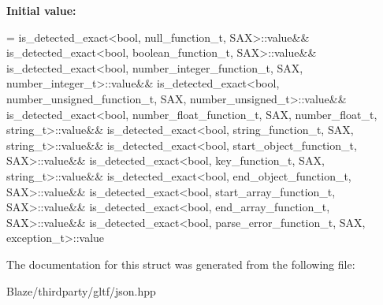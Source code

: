 {\bfseries Initial value\+:}
\begin{DoxyCode}
=
                is\_detected\_exact<bool, null\_function\_t, SAX>::value&&
                is\_detected\_exact<bool, boolean\_function\_t, SAX>::value&&
                is\_detected\_exact<bool, number\_integer\_function\_t, SAX,
                number\_integer\_t>::value&&
                is\_detected\_exact<bool, number\_unsigned\_function\_t, SAX,
                number\_unsigned\_t>::value&&
                is\_detected\_exact<bool, number\_float\_function\_t, SAX, number\_float\_t,
                string\_t>::value&&
                is\_detected\_exact<bool, string\_function\_t, SAX, string\_t>::value&&
                is\_detected\_exact<bool, start\_object\_function\_t, SAX>::value&&
                is\_detected\_exact<bool, key\_function\_t, SAX, string\_t>::value&&
                is\_detected\_exact<bool, end\_object\_function\_t, SAX>::value&&
                is\_detected\_exact<bool, start\_array\_function\_t, SAX>::value&&
                is\_detected\_exact<bool, end\_array\_function\_t, SAX>::value&&
                is\_detected\_exact<bool, parse\_error\_function\_t, SAX, exception\_t>::value
\end{DoxyCode}


The documentation for this struct was generated from the following file\+:\begin{DoxyCompactItemize}
\item 
Blaze/thirdparty/gltf/json.\+hpp\end{DoxyCompactItemize}
